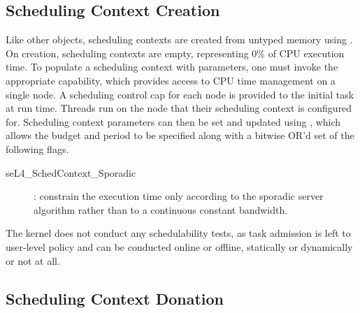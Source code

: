 \subsection{Scheduling Context Creation} \label{sec:sc_creation}

Like other objects, scheduling contexts are created from untyped memory using
.  On creation, scheduling contexts are empty,
representing 0\% of CPU execution time.  To populate a scheduling context with parameters, one must
invoke the appropriate  capability, which provides access to CPU time management
on a single node.  A scheduling control cap for each node is provided to the initial task at run
time.  Threads run on the node that their scheduling context is configured for.  Scheduling context
parameters can then be set and updated using
, which allows the budget and period
to be specified along with a bitwise OR'd set of the following flags.

\begin{description}

\item[seL4\_SchedContext\_Sporadic]: constrain the execution time only according to the
sporadic server algorithm rather than to a continuous constant bandwidth.

\end{description}

The kernel does not conduct any schedulability tests, as task admission is left to user-level policy
and can be conducted online or offline, statically or dynamically or not at all.

\subsection{Scheduling Context Donation}

